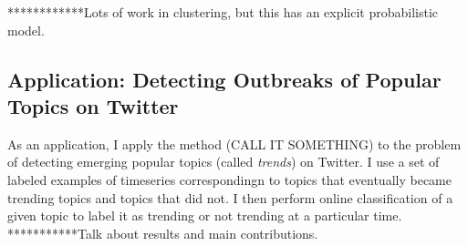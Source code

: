 ************Lots of work in clustering, but this has an explicit probabilistic model.

\subsection{Application: Detecting Outbreaks of Popular Topics on Twitter}
As an application, I apply the method (CALL IT SOMETHING) to the problem of detecting emerging popular topics (called {\em trends}) on Twitter. I use a set of labeled examples of timeseries correspondingn to topics that eventually became trending topics and topics that did not. I then perform online classification of a given topic to label it as trending or not trending at a particular time.
***********Talk about results and main contributions.

